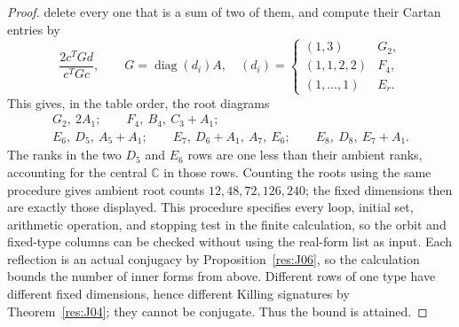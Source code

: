 \begin{proof}
delete every one that is a sum of two of them, and compute
their Cartan entries by
\[
 \frac{2c^T G d}{c^T G c},\qquad
 G=\operatorname{diag}(d_i)A,\quad
 (d_i)=
 \begin{cases}
 (1,3)&G_2,\\
 (1,1,2,2)&F_4,\\
 (1,\ldots,1)&E_r.
 \end{cases}
\]
This gives, in the table order, the root diagrams
\[
\begin{gathered}
 G_2,\ 2A_1;\qquad F_4,\ B_4,\ C_3+A_1;\\
 E_6,\ D_5,\ A_5+A_1;\qquad
 E_7,\ D_6+A_1,\ A_7,\ E_6;\qquad
 E_8,\ D_8,\ E_7+A_1 .
\end{gathered}
\]
The ranks in the two \(D_5\) and \(E_6\) rows are one less
than their ambient ranks, accounting for the central
\(\mathbb C\) in those rows. Counting the roots using the
same procedure gives ambient root counts
\(12,48,72,126,240\); the fixed dimensions then are exactly
those displayed. This procedure specifies every loop,
initial set, arithmetic operation, and stopping test in
the finite calculation, so the orbit and fixed-type
columns can be checked without using the real-form list
as input.
Each reflection is an actual conjugacy by
Proposition~\ref{res:J06}, so the calculation bounds the
number of inner forms from above. Different rows of one
type have different fixed dimensions, hence different
Killing signatures by Theorem~\ref{res:J04}; they cannot
be conjugate. Thus the bound is attained.


\end{proof}
